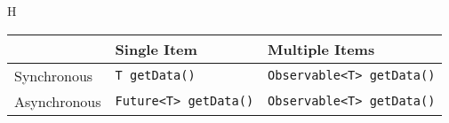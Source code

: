 \begin{table} {H}
\begin{tabular}{ |p{3cm}|p{3cm}|p{3cm}|  }
\hline
   & Single Item & Multiple Items \\
\hline
Synchronous &  \texttt{T getData()}   &  \texttt{Observable<T> getData()} \\
\hline
Asynchronous & \texttt{Future<T> getData()} &  \texttt{Observable<T> getData()} \\
\hline
\end{tabular}
\end{table}






